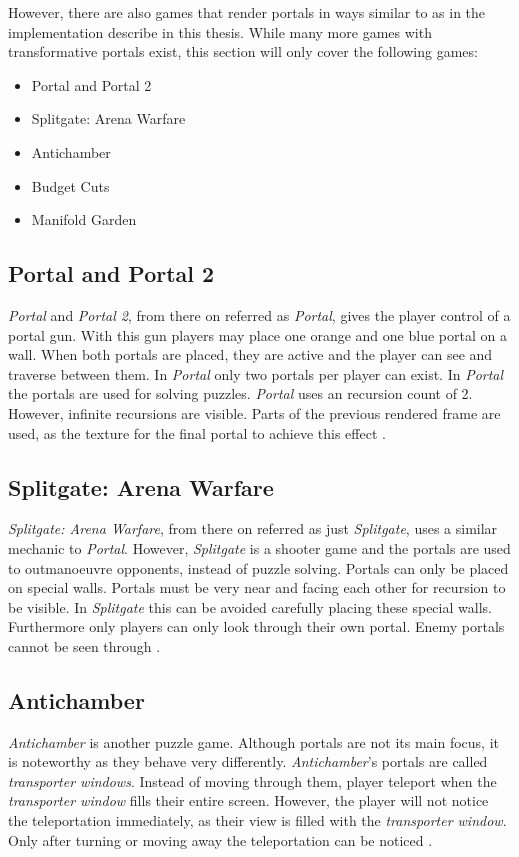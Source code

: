 However, there are also games that render portals in ways similar to as in the implementation describe in this thesis. While many more games with transformative portals exist, this section will only cover the following games:
\begin{itemize}
	\item Portal and Portal 2
	\item Splitgate: Arena Warfare
	\item Antichamber
	\item Budget Cuts
	\item Manifold Garden
	
	
\end{itemize}

\subsection{Portal and Portal 2}
\textit{Portal} and \textit{Portal 2}, from there on referred as \textit{Portal}, gives the player control of a portal gun. With this gun players may place one orange and one blue portal on a wall. When both portals are placed, they are active and the player can see and traverse between them. In \textit{Portal} only two portals per player can exist. In \textit{Portal} the portals are used for solving puzzles. \textit{Portal} uses an recursion count of 2. However, infinite recursions are visible. Parts of the previous rendered frame are used, as the texture for the final portal to achieve this effect \cite{lecture:portalProblems}.

\subsection{Splitgate: Arena Warfare}
\textit{Splitgate: Arena Warfare}, from there on referred as just \textit{Splitgate}, uses a similar mechanic to \textit{Portal}. However, \textit{Splitgate} is a shooter game and the portals are used to outmanoeuvre opponents, instead of puzzle solving. Portals can only be placed on special walls. Portals must be very near and facing each other for recursion to be visible. In \textit{Splitgate} this can be avoided carefully placing these special walls. Furthermore only players can only look through their own portal. Enemy portals cannot be seen through \cite{splitgate}.

\subsection{Antichamber}
\textit{Antichamber} is another puzzle game. Although portals are not its main focus, it is noteworthy as they behave very differently. \textit{Antichamber}'s portals are called \textit{transporter windows}. Instead of moving through them, player teleport when the \textit{transporter window} fills their entire screen. However, the player will not notice the teleportation immediately, as their view is filled with the \textit{transporter window}. Only after turning or moving away the teleportation can be noticed \cite{antichamber}.

